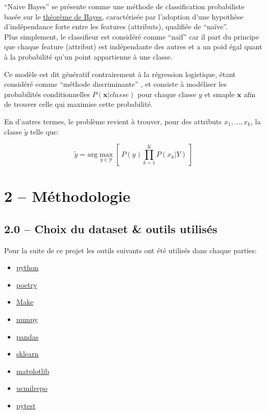 \documentclass[
]{article}
\providecommand{\tightlist}{%
  \setlength{\itemsep}{0pt}\setlength{\parskip}{0pt}}
\begin{document}
``Naive Bayes'' se présente comme une méthode de classification
probabiliste basée sur le
\href{https://en.wikipedia.org/wiki/Bayes\%27_theorem}{théorème de
Bayes}, caractérisée par l'adoption d'une hypothèse d'indépendance forte
entre les features (attributs), qualifiée de ``naïve''.\\
Plus simplement, le classifieur est considéré comme ``naïf'' car il part
du principe que chaque feature (attribut) est indépendante des autres et
a un poid égal quant à la probabilité qu'un point appartienne à une
classe.

Ce modèle est dit génératif contrairement à la régression logistique,
étant considéré comme ``méthode discriminante''
\cite{ClassifieurLineaire2022}, et consiste à modéliser les probabilités
conditionnelles \(P(\mathbf{x}| classe)\) pour chaque classe \(y\) et
smaple \(\mathbf{x}\) afin de trouver celle qui maximise cette
probabilité.

En d'autres termes, le problème revient à trouver, pour des attributs
\(x_1, \ldots, x_k\), la classe \(\tilde{y}\) telle que:

\[
\tilde{y} = \text{arg}\max_{y \in \mathcal{Y}} \left[\  P(y) \prod_{k = 1}^K{P(x_k | Y)}\  \right]
\]

\newpage

\section{2 -- Méthodologie}\label{muxe9thodologie}

\subsection{2.0 -- Choix du dataset \& outils
utilisés}\label{choix-du-dataset-outils-utilisuxe9s}

Pour la suite de ce projet les outils suivants ont été utilisés dans
chaque parties:

\begin{itemize}
\tightlist
\item
  \href{https://www.python.org/}{python}
\item
  \href{https://python-poetry.org/}{poetry}
\item
  \href{https://www.gnu.org/software/make/}{Make}
\item
  \href{https://numpy.org/}{numpy}
\item
  \href{https://pandas.pydata.org/}{pandas}
\item
  \href{https://scikit-learn.org/stable/}{sklearn}
\item
  \href{https://matplotlib.org/}{matplotlib}
\item
  \href{https://github.com/uci-ml-repo/ucimlrepo}{ucmilrepo}
\item
  \href{https://docs.pytest.org/en/stable/}{pytest}
\end{itemize}
\end{document}
